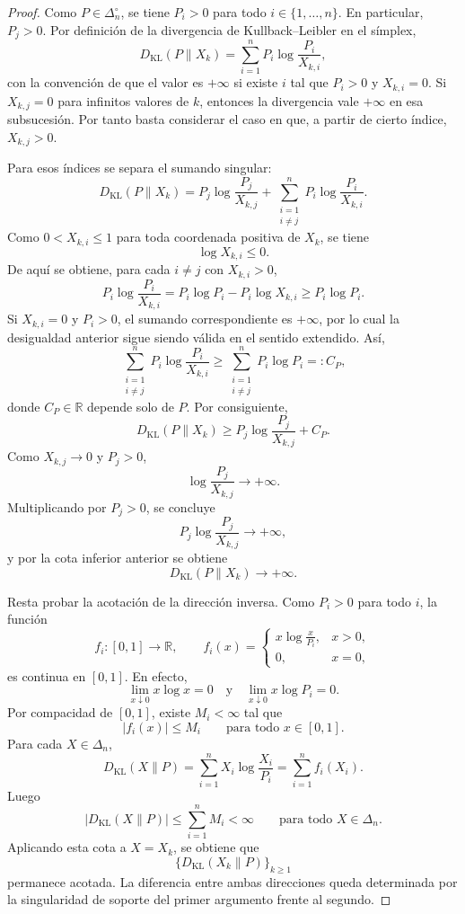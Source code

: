 \documentclass[12pt]{article}
\begin{document}
\begin{proof}
Como \(P\in\Delta_n^\circ\), se tiene \(P_i>0\) para todo \(i\in\{1,\ldots,n\}\). En particular, \(P_j>0\). Por definición de la divergencia de Kullback--Leibler en el símplex,
\[
D_{\mathrm{KL}}(P\|X_k)
=
\sum_{i=1}^n P_i\log\frac{P_i}{X_{k,i}},
\]
con la convención de que el valor es \(+\infty\) si existe \(i\) tal que \(P_i>0\) y \(X_{k,i}=0\). Si \(X_{k,j}=0\) para infinitos valores de \(k\), entonces la divergencia vale \(+\infty\) en esa subsucesión. Por tanto basta considerar el caso en que, a partir de cierto índice, \(X_{k,j}>0\).

Para esos índices se separa el sumando singular:
\[
D_{\mathrm{KL}}(P\|X_k)
=
P_j\log\frac{P_j}{X_{k,j}}
+
\sum_{\substack{i=1\\ i\ne j}}^n
P_i\log\frac{P_i}{X_{k,i}}.
\]
Como \(0<X_{k,i}\le 1\) para toda coordenada positiva de \(X_k\), se tiene
\[
\log X_{k,i}\le 0.
\]
De aquí se obtiene, para cada \(i\ne j\) con \(X_{k,i}>0\),
\[
P_i\log\frac{P_i}{X_{k,i}}
=
P_i\log P_i-P_i\log X_{k,i}
\ge
P_i\log P_i.
\]
Si \(X_{k,i}=0\) y \(P_i>0\), el sumando correspondiente es \(+\infty\), por lo cual la desigualdad anterior sigue siendo válida en el sentido extendido. Así,
\[
\sum_{\substack{i=1\\ i\ne j}}^n
P_i\log\frac{P_i}{X_{k,i}}
\ge
\sum_{\substack{i=1\\ i\ne j}}^n
P_i\log P_i
=:C_P,
\]
donde \(C_P\in\mathbb R\) depende solo de \(P\). Por consiguiente,
\[
D_{\mathrm{KL}}(P\|X_k)
\ge
P_j\log\frac{P_j}{X_{k,j}}+C_P.
\]
Como \(X_{k,j}\to0\) y \(P_j>0\),
\[
\log\frac{P_j}{X_{k,j}}\longrightarrow+\infty.
\]
Multiplicando por \(P_j>0\), se concluye
\[
P_j\log\frac{P_j}{X_{k,j}}\longrightarrow+\infty,
\]
y por la cota inferior anterior se obtiene
\[
D_{\mathrm{KL}}(P\|X_k)\longrightarrow+\infty.
\]

Resta probar la acotación de la dirección inversa. Como \(P_i>0\) para todo \(i\), la función
\[
f_i:[0,1]\longrightarrow\mathbb R,
\qquad
f_i(x)=
\begin{cases}
x\log\frac{x}{P_i}, & x>0,\\
0, & x=0,
\end{cases}
\]
es continua en \([0,1]\). En efecto,
\[
\lim_{x\downarrow0}x\log x=0
\quad\text{y}\quad
\lim_{x\downarrow0}x\log P_i=0.
\]
Por compacidad de \([0,1]\), existe \(M_i<\infty\) tal que
\[
|f_i(x)|\le M_i
\qquad
\text{para todo }x\in[0,1].
\]
Para cada \(X\in\Delta_n\),
\[
D_{\mathrm{KL}}(X\|P)
=
\sum_{i=1}^n
X_i\log\frac{X_i}{P_i}
=
\sum_{i=1}^n f_i(X_i).
\]
Luego
\[
\left|D_{\mathrm{KL}}(X\|P)\right|
\le
\sum_{i=1}^n M_i
<\infty
\qquad
\text{para todo }X\in\Delta_n.
\]
Aplicando esta cota a \(X=X_k\), se obtiene que
\[
\{D_{\mathrm{KL}}(X_k\|P)\}_{k\ge1}
\]
permanece acotada. La diferencia entre ambas direcciones queda determinada por la singularidad de soporte del primer argumento frente al segundo.
\end{proof}
\end{document}
